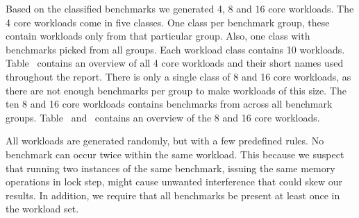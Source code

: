 



Based on the classified benchmarks we generated 4, 8 and 16 core workloads.
The 4 core workloads come in five classes.
One class per benchmark group, these contain workloads only from that particular group.
Also, one class with benchmarks picked from all groups.
Each workload class contains 10 workloads.
Table~ contains an overview of all 4 core workloads and their short names used throughout the report.
There is only a single class of 8 and 16 core workloads, as there are not enough benchmarks per group to make workloads of this size. 
The ten 8 and 16 core workloads contains benchmarks from across all benchmark groups.
Table~ and~ contains an overview of the 8 and 16 core workloads.

All workloads are generated randomly, but with a few predefined rules.
No benchmark can occur twice within the same workload.
This because we suspect that running two instances of the same benchmark, issuing the same memory operations in lock step, might cause unwanted interference that could skew our results. 
In addition, we require that all benchmarks be present at least once in the workload set.